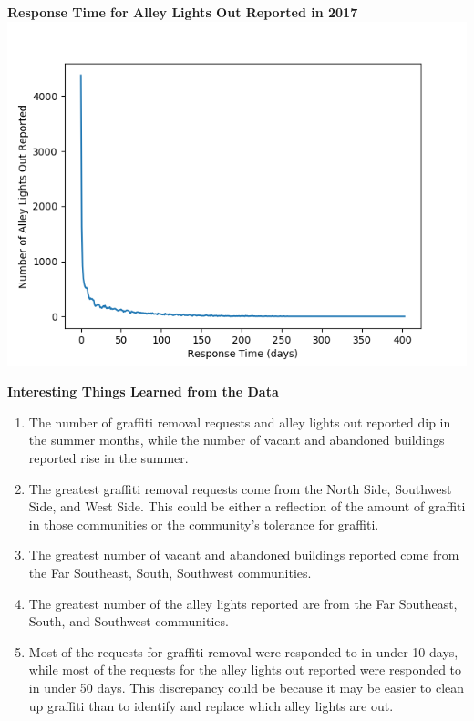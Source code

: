 \documentclass[letterpaper,12pt]{article}
\begin{document}
\newpage

\noindent \textbf{Response Time for Alley Lights Out Reported in 2017} \\
\includegraphics[scale=1]{responseoveralleys.png}

\noindent \textbf{Interesting Things Learned from the Data}
\begin{enumerate}
\item The number of graffiti removal requests and alley lights out reported dip in the summer months, while the number of vacant and abandoned buildings reported rise in the summer.
\item The greatest graffiti removal requests come from the North Side, Southwest Side, and West Side. This could be either a reflection of the amount of graffiti in those communities or the community's tolerance for graffiti.
\item The greatest number of vacant and abandoned buildings reported come from the Far Southeast, South, Southwest communities.
\item The greatest number of the alley lights reported are from the Far Southeast, South, and Southwest communities.
\item Most of the requests for graffiti removal were responded to in under 10 days, while most of the requests for the alley lights out reported were responded to in under 50 days. This discrepancy could be because it may be easier to clean up graffiti than to identify and replace which alley lights are out.
\end{enumerate}

\newpage
\end{document}
